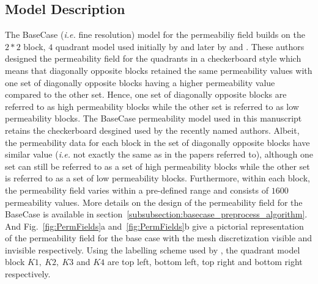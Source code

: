 \documentclass[preprint,12pt]{elsarticle}
\begin{document}
\subsection{Model Description}\label{subsection:model}
The BaseCase  ({\it i.e.} fine resolution) model for the permeabiliy field builds on the $2 * 2$ block, $4$ quadrant model used initially by \citet{Cardwell_1945} and later by \citet{Yeo2001} and \citet{dawe_2008}. These authors designed the permeability field for the quadrants in a checkerboard style which means that diagonally opposite blocks retained the same permeability values with one set of diagonally opposite blocks having a higher permeability value compared to the other set. Hence, one set of diagonally opposite blocks are referred to as high permeability blocks while the other set is referred to as low permeability blocks. The BaseCase permeability model used in this manuscript retains the checkerboard desgined used by the recently named authors. Albeit, the permeability data for each block in the set of diagonally opposite blocks have similar value ({\it i.e.} not exactly the same as in the papers referred to), although one set can still be referred to as a set of high permeability blocks while the other set is referred to as a set of low permeability blocks. Furthermore, within each block, the permeability field varies within a pre-defined range and consists of $1600$ permeability values. More details on the design of the permeability field for the BaseCase is available in section~\ref{subsubsection:basecase_preprocess_algorithm}. And Fig.~\ref{fig:PermFields}a and~\ref{fig:PermFields}b give a pictorial representation of the permeability field for the base case with the mesh discretization visible and invisible respectively. Using the labelling scheme used by \citet{dawe_2008}, the quadrant model block $K1,~K2,~K3$ and $K4$ are top left, bottom left, top right and bottom right respectively.
\end{document}
